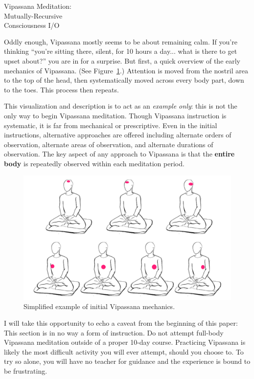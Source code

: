 \documentclass{article}
\begin{document}
\pagebreak

\begin{center}
  \Huge{Vipassana Meditation:}\\
  \Huge{Mutually-Recursive}\\
  \Huge{Consciousness I/O}
\end{center}

Oddly enough, Vipassana mostly seems to be about remaining calm. If you're thinking ``you're sitting there, silent, for 10 hours a day... what is there to get upset about?'' you are in for a surprise. But first, a quick overview of the early mechanics of Vipassana. (See Figure~\ref{fig:vipassana-mechanics}.)
Attention is moved from the nostril area to the top of the head, then systematically moved across every body part, down to the toes. This process then repeats.

This visualization and description is to act as an \textit{example only}: this is not the only way to begin Vipassana meditation. Though Vipassana instruction is systematic, it is far from mechanical or prescriptive. Even in the initial instructions, alternative approaches are offered including alternate orders of observation, alternate areas of observation, and alternate durations of observation. The key aspect of any approach to Vipassana is that the \textbf{entire body} is repeatedly observed within each meditation period.

\begin{figure}[h]
  \centering
  \includegraphics[width=\linewidth]{images/burmese-vipassana-mechanics.png}
  \caption{Simplified example of initial Vipassana mechanics.}
  \label{fig:vipassana-mechanics}
\end{figure}

I will take this opportunity to echo a caveat from the beginning of this paper: This section is in no way a form of instruction. Do not attempt full-body Vipassana meditation outside of a proper 10-day course. Practicing Vipassana is likely the most difficult activity you will ever attempt, should you choose to. To try so alone, you will have no teacher for guidance and the experience is bound to be frustrating.
\end{document}
